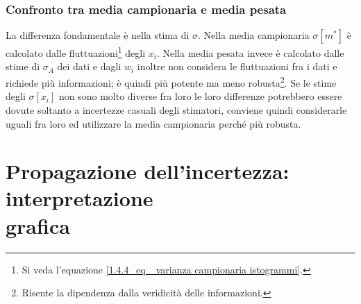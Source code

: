 \documentclass[11pt,a4paper]{book}
\begin{document}
\subsubsection{Confronto tra media campionaria e media pesata} 
La differenza fondamentale è nella stima di $ \sigma $.
Nella media campionaria $ \sigma[m^*] $ è calcolato dalle fluttuazioni\footnote{Si veda l'equazione \eqref{1.4.4_eq_ varianza campionaria istogrammi}.} degli $ x_i $. Nella media pesata invece è calcolato dalle stime di $ \sigma_A $ dei dati e dagli $ w_i $ inoltre non considera le fluttuazioni fra i dati e richiede più informazioni; è quindi più potente ma meno robusta\footnote{Risente la dipendenza dalla veridicità delle informazioni.}. Se le stime degli $ \sigma[x_i] $ non sono molto diverse fra loro le loro differenze potrebbero essere dovute soltanto a incertezze casuali degli stimatori, conviene quindi considerarle uguali fra loro ed utilizzare la media campionaria perché più robusta.
\section[Propagazione via metodo grafico]{Propagazione dell'incertezza: interpretazione \\grafica} 
\end{document}
